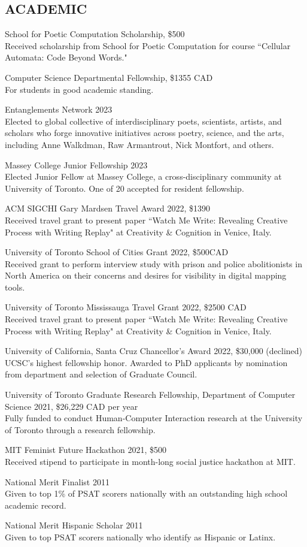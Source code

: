  \subsection{ACADEMIC}
 
School for Poetic Computation Scholarship, \$500  \\
Received scholarship from School for Poetic Computation for course ``Cellular Automata: Code Beyond Words."
 
Computer Science Departmental Fellowship, \$1355 CAD \\
For students in good academic standing. 
 
Entanglements Network 2023 \\
 Elected to global collective of interdisciplinary poets, scientists, artists, and scholars who forge innovative initiatives across poetry, science, and the arts, including Anne Walkdman, Raw Armantrout, Nick Montfort, and others. 

 Massey College Junior Fellowship 2023 \\
 Elected Junior Fellow at Massey College, a cross-disciplinary community at University of Toronto. One of 20 accepted for resident fellowship.  
 
 ACM SIGCHI Gary Mardsen Travel Award 2022, \$1390  \\
Received travel grant to present paper ``Watch Me Write: Revealing Creative Process with Writing Replay" at Creativity \& Cognition in Venice, Italy.
 
University of Toronto School of Cities Grant 2022, \$500CAD \\
Received grant to perform interview study with prison and police abolitionists in North America on their concerns and desires for visibility in digital mapping tools.

University of Toronto Mississauga Travel Grant 2022, \$2500 CAD \\
Received travel grant to present paper ``Watch Me Write: Revealing Creative Process with Writing Replay" at Creativity \& Cognition in Venice, Italy.

University of California, Santa Cruz Chancellor's Award 2022, \$30,000 (declined) \\
UCSC's highest fellowship honor. Awarded to PhD applicants by nomination from department and selection of Graduate Council.

University of Toronto Graduate Research Fellowship, Department of Computer Science 2021, \$26,229 CAD per year \\
Fully funded to conduct Human-Computer Interaction research at the University of Toronto through a research fellowship. 

MIT Feminist Future Hackathon 2021, \$500 \\
Received stipend to participate in month-long social justice hackathon at MIT. 


National Merit Finalist 2011 \\
Given to top 1\% of PSAT scorers nationally with an outstanding high school academic record. 

National Merit Hispanic Scholar 2011 \\
Given to top PSAT scorers nationally who identify as Hispanic or Latinx. 